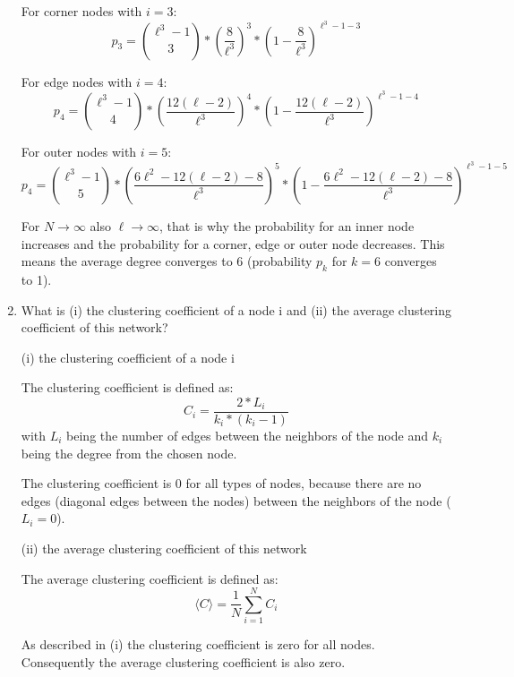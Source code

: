 \begin{enumerate}
	For corner nodes with $i=3$:
	\begin{equation*}
		p_3 = {{\ell^3-1}\choose{3}} * ({\frac{8}{\ell^3}})^3 * (1-{\frac{8}{\ell^3}})^{\ell^3-1-3}
	\end{equation*}
	
	For edge nodes with $i=4$:
	\begin{equation*}
		p_4 = {{\ell^3-1}\choose{4}} * ({\frac{12(\ell - 2)}{\ell^3}})^4 * (1-{\frac{12(\ell - 2)}{\ell^3}})^{\ell^3-1-4}
	\end{equation*}
	
	For outer nodes with $i=5$:
	\begin{equation*}
		p_4 = {{\ell^3-1}\choose{5}} * ({\frac{6\ell^2 - 12(\ell - 2) - 8}{\ell^3}})^5 * (1-{\frac{6\ell^2 - 12(\ell - 2) - 8}{\ell^3}})^{\ell^3-1-5}
	\end{equation*}
	
	For $N \rightarrow \infty$ also $\ell \rightarrow \infty$, that is why the probability for an inner node increases and the probability for a corner, edge or outer node decreases. This means the average degree converges to 6 (probability $p_k$ for $k=6$ converges to 1).
	
	\item What is (i) the clustering coefficient of a node i and (ii) the average clustering coefficient of this network?
	\vspace{0.25cm}
	
	(i) the clustering coefficient of a node i
	
	The clustering coefficient is defined as:
	\begin{equation*}
		C_i = \frac{2*L_i}{k_i * (k_i-1)}
	\end{equation*}
	with $L_i$ being the number of edges between the neighbors of the node and $k_i$ being the degree from the chosen node.
	
	The clustering coefficient is 0 for all types of nodes, because there are no edges (diagonal edges between the nodes) between the neighbors of the node ($L_i = 0$).
	
	(ii) the average clustering coefficient of this network
	
	The average clustering coefficient is defined as:
	\begin{equation*}
		\langle C \rangle = \frac{1}{N} \sum_{i=1}^{N} C_i
	\end{equation*}
	
	As described in (i) the clustering coefficient is zero for all nodes. Con\-se\-quent\-ly the average clustering coefficient is also zero.
	

\end{enumerate}

